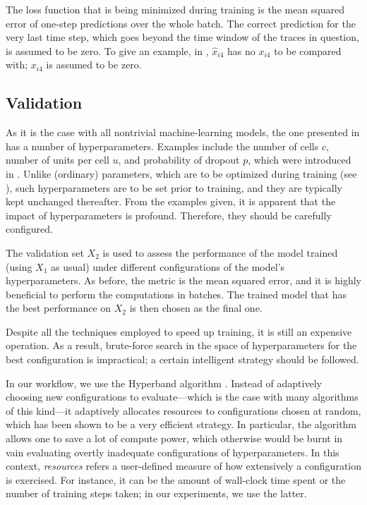 The loss function that is being minimized during training is the mean squared
error \cite{hastie2009} of one-step predictions over the whole batch. The
correct prediction for the very last time step, which goes beyond the time
window of the traces in question, is assumed to be zero. To give an example, in
, $\hat{x}_{i4}$ has no $x_{i4}$ to be compared with; $x_{i4}$ is
assumed to be zero.

\subsection{Validation} 
As it is the case with all nontrivial machine-learning models, the one presented
in  has a number of hyperparameters. Examples include the number of
cells $c$, number of units per cell $u$, and probability of dropout $p$, which
were introduced in . Unlike (ordinary) parameters, which are to
be optimized during training (see ), such hyperparameters are to
be set prior to training, and they are typically kept unchanged thereafter. From
the examples given, it is apparent that the impact of hyperparameters is
profound. Therefore, they should be carefully configured.

The validation set $X_2$ is used to assess the performance of the model trained
(using $X_1$ as usual) under different configurations of the model's
hyperparameters. As before, the metric is the mean squared error, and it is
highly beneficial to perform the computations in batches. The trained model that
has the best performance on $X_2$ is then chosen as the final one.

Despite all the techniques employed to speed up training, it is still an
expensive operation. As a result, brute-force search in the space of
hyperparameters for the best configuration is impractical; a certain intelligent
strategy should be followed.

In our workflow, we use the Hyperband algorithm \cite{li2016}. Instead of
adaptively choosing new configurations to evaluate---which is the case with many
algorithms of this kind---it adaptively allocates resources to configurations
chosen at random, which has been shown to be a very efficient strategy. In
particular, the algorithm allows one to save a lot of compute power, which
otherwise would be burnt in vain evaluating overtly inadequate configurations of
hyperparameters. In this context, \emph{resources} refers a user-defined measure
of how extensively a configuration is exercised. For instance, it can be the
amount of wall-clock time spent or the number of training steps taken; in our
experiments, we use the latter.

